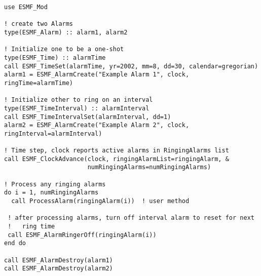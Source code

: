 
\begin{verbatim}
use ESMF_Mod

! create two Alarms
type(ESMF_Alarm) :: alarm1, alarm2

! Initialize one to be a one-shot
type(ESMF_Time) :: alarmTime
call ESMF_TimeSet(alarmTime, yr=2002, mm=8, dd=30, calendar=gregorian)
alarm1 = ESMF_AlarmCreate("Example Alarm 1", clock, ringTime=alarmTime)

! Initialize other to ring on an interval
type(ESMF_TimeInterval) :: alarmInterval
call ESMF_TimeIntervalSet(alarmInterval, dd=1)
alarm2 = ESMF_AlarmCreate("Example Alarm 2", clock, ringInterval=alarmInterval)

! Time step, clock reports active alarms in RingingAlarms list
call ESMF_ClockAdvance(clock, ringingAlarmList=ringingAlarm, &
                       numRingingAlarms=numRingingAlarms)

! Process any ringing alarms
do i = 1, numRingingAlarms
  call ProcessAlarm(ringingAlarm(i))  ! user method

 ! after processing alarms, turn off interval alarm to reset for next
 !   ring time
 call ESMF_AlarmRingerOff(ringingAlarm(i))
end do

call ESMF_AlarmDestroy(alarm1)
call ESMF_AlarmDestroy(alarm2)
\end{verbatim}
